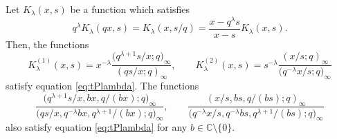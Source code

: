 \documentclass[pdftex]{sigma}
\numberwithin{equation}{section}
\theoremstyle{definition}
\begin{document}
Let $K_{\lambda}(x, s) $ be a function which satisfies
\begin{equation}
q^{\lambda } K_{\lambda}(qx, s) = K_{\lambda}(x, s/q) = \frac{ x - q^{\lambda } s}{x - s} K_{\lambda}(x, s).  \label{eq:tPlambda}
\end{equation}
Then, the functions
\begin{equation}
K^{(1)}_{\lambda}(x, s) = x^{-\lambda } \frac{\bigl(q^{\lambda+1}s/x;q\bigr)_{\infty}}{(qs/x;q)_{\infty}} , \qquad K^{(2)}_{\lambda}(x, s) = s^{-\lambda } \frac{(x/s;q)_{\infty}}{\bigl(q^{-\lambda }x/s;q\bigr)_{\infty}}
 \label{eq:tP1tP2}
\end{equation}
satisfy equation \eqref{eq:tPlambda}.
The functions
\begin{equation*}
 \frac{\bigl(q^{\lambda+1}s/x , b x , q/(b x) ;q\bigr)_{\infty}}{\bigl(qs/x, q^{-\lambda } b x, q^{\lambda +1} /(bx) ;q\bigr)_{\infty}} , \qquad \frac{(x/s , b s , q/(b s) ;q)_{\infty}}{\bigl(q^{-\lambda }x/s , q^{-\lambda } b s, q^{\lambda +1} /(bs) ;q\bigr)_{\infty}}
\end{equation*}
also satisfy equation \eqref{eq:tPlambda} for any $b \in \mathbb{C} \setminus \{ 0 \} $.
\end{document}
